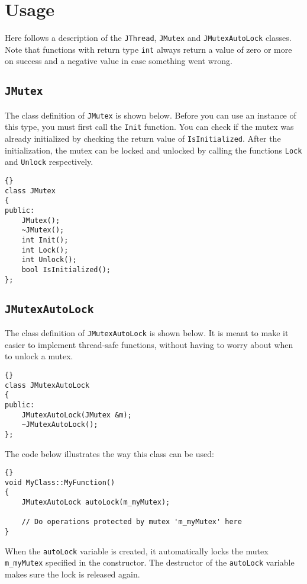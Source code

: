\documentclass[a4paper,12pt]{article}
\begin{document}
	\section{Usage}

	Here follows a description of the {\tt JThread}, {\tt JMutex} and 
	{\tt JMutexAutoLock} classes. 
	Note that functions with return type {\tt int} always return a value of zero
	or more on success and a negative value in case something went wrong.

	\subsection{{\tt JMutex}}

	The class definition of {\tt JMutex} is shown below. Before you can use an
	instance of this type, you must first call the {\tt Init} function. You can
	check if the mutex was already initialized by checking the return value
	of {\tt IsInitialized}. After the initialization, the mutex can be locked
	and unlocked by calling the functions {\tt Lock} and {\tt Unlock} respectively.

\begin{lstlisting}[frame=tb]{}
class JMutex
{
public:
	JMutex();
	~JMutex();
	int Init();
	int Lock();
	int Unlock();
	bool IsInitialized();
};	
\end{lstlisting}

	\subsection{{\tt JMutexAutoLock}}

	The class definition of {\tt JMutexAutoLock} is shown below. It is meant
	to make it easier to implement thread-safe functions, without having to
	worry about when to unlock a mutex.

\begin{lstlisting}[frame=tb]{}
class JMutexAutoLock
{
public:
	JMutexAutoLock(JMutex &m);
	~JMutexAutoLock();
};
\end{lstlisting}

	The code below illustrates the way this class can be used:

\begin{lstlisting}[frame=tb]{}
void MyClass::MyFunction()
{
	JMutexAutoLock autoLock(m_myMutex);
	
	// Do operations protected by mutex 'm_myMutex' here
}
\end{lstlisting}
	
	When the {\tt autoLock} variable is created, it automatically locks the
	mutex {\tt m\_myMutex} specified in the constructor. The destructor of
	the {\tt autoLock} variable makes sure the lock is released again.
\end{document}
